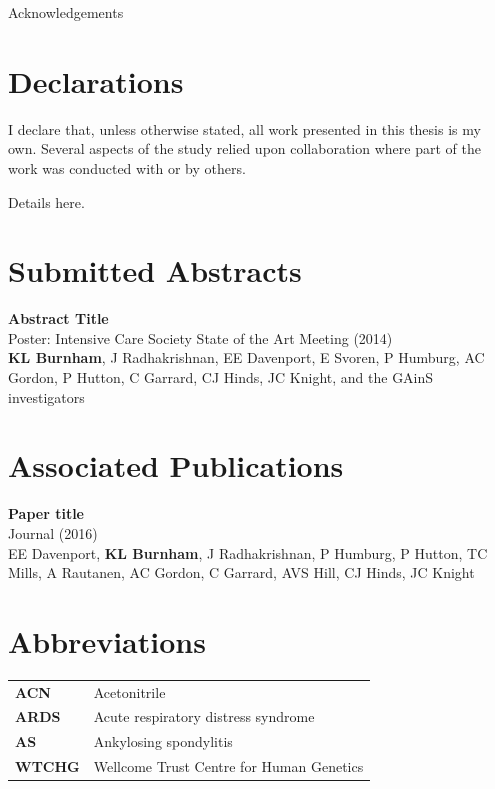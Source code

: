 Acknowledgements

\newpage
\chapter*{Declarations}
\thispagestyle{plain}
\noindent

I declare that, unless otherwise stated, all work presented in this thesis is my own. Several aspects of the study relied upon collaboration where part of the work was conducted with or by others.

Details here.

\newpage

\chapter*{Submitted Abstracts}
\thispagestyle{plain} %

\noindent
\textbf{Abstract Title}\\
Poster: Intensive Care Society State of the Art Meeting (2014)\\
\textbf{KL Burnham}, J Radhakrishnan, EE Davenport, E Svoren, P Humburg, AC Gordon, P Hutton, C Garrard, CJ Hinds, JC Knight, and the GAinS investigators\\


\newpage
\chapter*{Associated Publications}
\thispagestyle{plain}

\noindent
\textbf{Paper title}\\
Journal (2016)\\
EE Davenport, \textbf{KL Burnham}, J Radhakrishnan, P Humburg, P Hutton, TC Mills, A Rautanen, AC Gordon, C Garrard, AVS Hill, CJ Hinds, JC Knight\\

\newpage
{}
\tableofcontents

\newpage
\listoffigures
{}

\newpage
\listoftables
{}

\chapter*{Abbreviations}

\begin{longtable}{l l}
		\textbf{ACN} & Acetonitrile \\
		\textbf{ARDS} & Acute respiratory distress syndrome \\
   	\textbf{AS} & Ankylosing spondylitis \\
		\textbf{WTCHG} & Wellcome Trust Centre for Human Genetics \\
\end{longtable}
